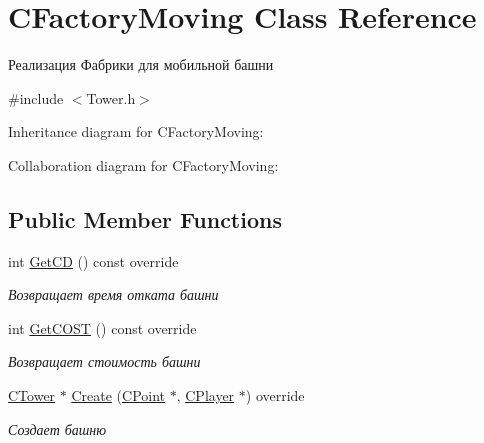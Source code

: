 \hypertarget{classCFactoryMoving}{}\section{C\+Factory\+Moving Class Reference}
\label{classCFactoryMoving}


Реализация Фабрики для мобильной башни  




{\ttfamily \#include $<$Tower.\+h$>$}



Inheritance diagram for C\+Factory\+Moving\+:


Collaboration diagram for C\+Factory\+Moving\+:
\subsection*{Public Member Functions}
\begin{DoxyCompactItemize}
\item 
int \hyperlink{classCFactoryMoving_ad6ecf0ee9832cd2658f123c7480cf6f3}{Get\+CD} () const override\hypertarget{classCFactoryMoving_ad6ecf0ee9832cd2658f123c7480cf6f3}{}\label{classCFactoryMoving_ad6ecf0ee9832cd2658f123c7480cf6f3}

\begin{DoxyCompactList}\small\item\em Возвращает время отката башни \end{DoxyCompactList}\item 
int \hyperlink{classCFactoryMoving_a4bc59012bf43fc61f6e30b7d54391be9}{Get\+C\+O\+ST} () const override\hypertarget{classCFactoryMoving_a4bc59012bf43fc61f6e30b7d54391be9}{}\label{classCFactoryMoving_a4bc59012bf43fc61f6e30b7d54391be9}

\begin{DoxyCompactList}\small\item\em Возвращает стоимость башни \end{DoxyCompactList}\item 
\hyperlink{classCTower}{C\+Tower} $\ast$ \hyperlink{classCFactoryMoving_a2465cc2e74fd769bf84839c12d87d5eb}{Create} (\hyperlink{classCPoint}{C\+Point} $\ast$, \hyperlink{classCPlayer}{C\+Player} $\ast$) override
\begin{DoxyCompactList}\small\item\em Создает башню \end{DoxyCompactList}\end{DoxyCompactItemize}


